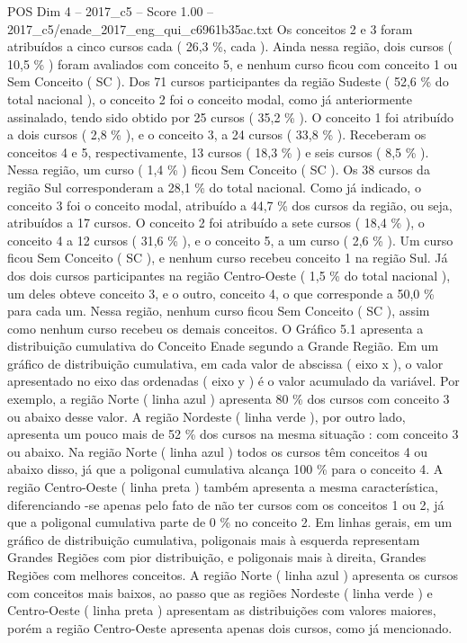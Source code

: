 \begin{textsample}{POS Dim 4 – 2017\_c5 – Score 1.00 – 2017\_c5/enade\_2017\_eng\_qui\_c6961b35ac.txt}
Os conceitos 2 e 3 foram atribuídos a cinco cursos cada ( 26,3 \%, cada ).
Ainda nessa região, dois cursos ( 10,5 \% ) foram avaliados com conceito 5, e nenhum curso ficou com conceito 1 ou Sem Conceito ( SC ).
Dos 71 cursos participantes da região Sudeste ( 52,6 \% do total nacional ), o conceito 2 foi o conceito modal, como já anteriormente assinalado, tendo sido obtido por 25 cursos ( 35,2 \% ).
O conceito 1 foi atribuído a dois cursos ( 2,8 \% ), e o conceito 3, a 24 cursos ( 33,8 \% ).
Receberam os conceitos 4 e 5, respectivamente, 13 cursos ( 18,3 \% ) e seis cursos ( 8,5 \% ).
Nessa região, um curso ( 1,4 \% ) ficou Sem Conceito ( SC ).
Os 38 cursos da região Sul corresponderam a 28,1 \% do total nacional.
Como já indicado, o conceito 3 foi o conceito modal, atribuído a 44,7 \% dos cursos da região, ou seja, atribuídos a 17 cursos.
O conceito 2 foi atribuído a sete cursos ( 18,4 \% ), o conceito 4 a 12 cursos ( 31,6 \% ), e o conceito 5, a um curso ( 2,6 \% ).
Um curso ficou Sem Conceito ( SC ), e nenhum curso recebeu conceito 1 na região Sul.
Já dos dois cursos participantes na região Centro-Oeste ( 1,5 \% do total nacional ), um deles obteve conceito 3, e o outro, conceito 4, o que corresponde a 50,0 \% para cada um.
Nessa região, nenhum curso ficou Sem Conceito ( SC ), assim como nenhum curso recebeu os demais conceitos.
O Gráfico 5.1 apresenta a distribuição cumulativa do Conceito Enade segundo a Grande Região.
Em um gráfico de distribuição cumulativa, em cada valor de abscissa ( eixo x ), o valor apresentado no eixo das ordenadas ( eixo y ) é o valor acumulado da variável.
Por exemplo, a região Norte ( linha azul ) apresenta 80 \% dos cursos com conceito 3 ou abaixo desse valor.
A região Nordeste ( linha verde ), por outro lado, apresenta um pouco mais de 52 \% dos cursos na mesma situação : com conceito 3 ou abaixo.
Na região Norte ( linha azul ) todos os cursos têm conceitos 4 ou abaixo disso, já que a poligonal cumulativa alcança 100 \% para o conceito 4.
A região Centro-Oeste ( linha preta ) também apresenta a mesma característica, diferenciando -se apenas pelo fato de não ter cursos com os conceitos 1 ou 2, já que a poligonal cumulativa parte de 0 \% no conceito 2.
Em linhas gerais, em um gráfico de distribuição cumulativa, poligonais mais à esquerda representam Grandes Regiões com pior distribuição, e poligonais mais à direita, Grandes Regiões com melhores conceitos.
A região Norte ( linha azul ) apresenta os cursos com conceitos mais baixos, ao passo que as regiões Nordeste ( linha verde ) e Centro-Oeste ( linha preta ) apresentam as distribuições com valores maiores, porém a região Centro-Oeste apresenta apenas dois cursos, como já mencionado.

\end{textsample}
